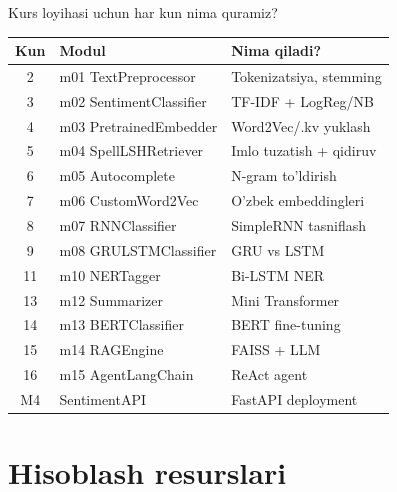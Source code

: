 \documentclass[aspectratio=169,11pt]{beamer}
\begin{document}
\begin{frame}{Kurs loyihasi uchun har kun nima quramiz?}
  \begin{center}
  \small
  \begin{tabular}{cll}
    \toprule
    \textbf{Kun} & \textbf{Modul} & \textbf{Nima qiladi?} \\
    \midrule
    2  & m01 TextPreprocessor   & Tokenizatsiya, stemming \\
    3  & m02 SentimentClassifier& TF-IDF + LogReg/NB \\
    4  & m03 PretrainedEmbedder & Word2Vec/.kv yuklash \\
    5  & m04 SpellLSHRetriever  & Imlo tuzatish + qidiruv \\
    6  & m05 Autocomplete       & N-gram to'ldirish \\
    7  & m06 CustomWord2Vec     & O'zbek embeddingleri \\
    8  & m07 RNNClassifier      & SimpleRNN tasniflash \\
    9  & m08 GRULSTMClassifier  & GRU vs LSTM \\
    11 & m10 NERTagger          & Bi-LSTM NER \\
    13 & m12 Summarizer         & Mini Transformer \\
    14 & m13 BERTClassifier     & BERT fine-tuning \\
    15 & m14 RAGEngine          & FAISS + LLM \\
    16 & m15 AgentLangChain     & ReAct agent \\
    M4 & SentimentAPI           & FastAPI deployment \\
    \bottomrule
  \end{tabular}
  \end{center}
\end{frame}

\section[Hisoblash]{Hisoblash resurslari}
\end{document}
